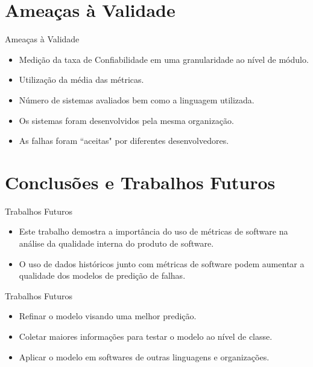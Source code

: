 \documentclass[t,14pt,mathserif]{beamer}
\begin{document}
\section{Ameaças à Validade}
\begin{frame}{Ameaças à Validade}

	\begin{itemize}
	
		\item Medição da taxa de Confiabilidade em uma granularidade ao nível de módulo.
		\item Utilização da média das métricas.
		\item Número de sistemas avaliados bem como a linguagem utilizada.
		\item Os sistemas foram desenvolvidos pela mesma organização.
		\item As falhas foram ``aceitas" por diferentes desenvolvedores.
	\end{itemize}		
	
\end{frame}

\section{Conclusões e Trabalhos Futuros}
\begin{frame}{Trabalhos Futuros}
	
	\begin{itemize}
		\item Este trabalho demostra a importância do uso de métricas de software na análise da qualidade interna do produto de software.
		\item O uso de dados históricos junto com métricas de software podem aumentar a qualidade dos modelos de predição de falhas.
	\end{itemize}

\end{frame}


\begin{frame}{Trabalhos Futuros}
	\begin{itemize}
	
		\item Refinar o modelo visando uma melhor predição.
		\item Coletar maiores informações para testar o modelo ao nível de classe.
		\item Aplicar o modelo em softwares de outras linguagens e organizações.

	\end{itemize}

\end{frame}
\end{document}

